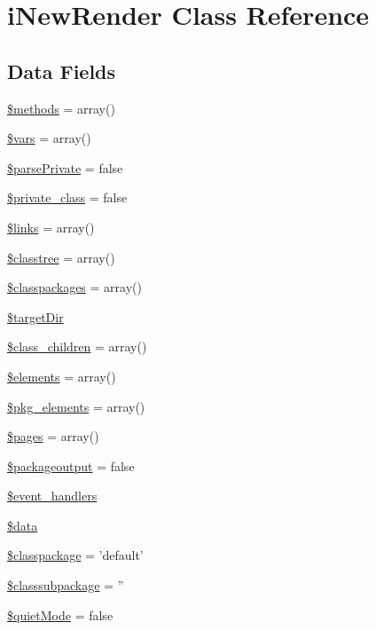 \hypertarget{classi_new_render}{\section{i\-New\-Render \-Class \-Reference}
\label{classi_new_render}
}
\subsection*{\-Data \-Fields}
\begin{DoxyCompactItemize}
\item 
\hyperlink{classi_new_render_a802753499268a04da139bd6e6ef89b35}{\$methods} = array()
\item 
\hyperlink{classi_new_render_a09f2c833c130b4443725fb576d9d5269}{\$vars} = array()
\item 
\hyperlink{classi_new_render_a351b7c7ced5d5cd6ce87029cca64d150}{\$parse\-Private} = false
\item 
\hyperlink{classi_new_render_a91bc6a84d69355cf5bf3fcae3d97df26}{\$private\-\_\-class} = false
\item 
\hyperlink{classi_new_render_a4ca8be3ff3cf95aa3af546449c1f1bec}{\$links} = array()
\item 
\hyperlink{classi_new_render_a91586855b939070da6b9129525ac9d55}{\$classtree} = array()
\item 
\hyperlink{classi_new_render_a09bcc1887501550f7572bb4e997ed6cd}{\$classpackages} = array()
\item 
\hyperlink{classi_new_render_aae33ae3051c6f350bb69a0631ade81d9}{\$target\-Dir}
\item 
\hyperlink{classi_new_render_a6b5678398e9312d863f634e68cc0c99c}{\$class\-\_\-children} = array()
\item 
\hyperlink{classi_new_render_ad18dd8fbe31b294e2bc4711dcde4548d}{\$elements} = array()
\item 
\hyperlink{classi_new_render_af833d646cb2d71e00831b24d1cbd9cdf}{\$pkg\-\_\-elements} = array()
\item 
\hyperlink{classi_new_render_a263621399c53f2952c2329ee13ad8e4e}{\$pages} = array()
\item 
\hyperlink{classi_new_render_ae42e8e1aebbb7e9af6f8b463703e90a0}{\$packageoutput} = false
\item 
\hyperlink{classi_new_render_a43c58b8476d3252c39f474e1eb9169df}{\$event\-\_\-handlers}
\item 
\hyperlink{classi_new_render_a6efc15b5a2314dd4b5aaa556a375c6d6}{\$data}
\item 
\hyperlink{classi_new_render_ab1034a49bae93ff3279b56372ff43155}{\$classpackage} = 'default'
\item 
\hyperlink{classi_new_render_a5a625401e0cae21858cba45b196611bb}{\$classsubpackage} = ''
\item 
\hyperlink{classi_new_render_a7b06630dd83a1912cca52476a5438f9e}{\$quiet\-Mode} = false
\end{DoxyCompactItemize}


